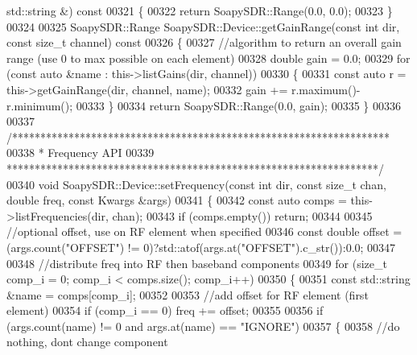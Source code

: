 \begin{DoxyCode}
      std::string &)\textcolor{keyword}{ const}
00321 \textcolor{keyword}{}\{
00322     \textcolor{keywordflow}{return} SoapySDR::Range(0.0, 0.0);
00323 \}
00324 
00325 SoapySDR::Range SoapySDR::Device::getGainRange(\textcolor{keyword}{const} \textcolor{keywordtype}{int} dir, \textcolor{keyword}{const} \textcolor{keywordtype}{size\_t} channel)\textcolor{keyword}{ const}
00326 \textcolor{keyword}{}\{
00327     \textcolor{comment}{//algorithm to return an overall gain range (use 0 to max possible on each element)}
00328     \textcolor{keywordtype}{double} gain = 0.0;
00329     \textcolor{keywordflow}{for} (\textcolor{keyword}{const} \textcolor{keyword}{auto} &name : this->listGains(dir, channel))
00330     \{
00331         \textcolor{keyword}{const} \textcolor{keyword}{auto} r = this->getGainRange(dir, channel, name);
00332         gain += r.maximum()-r.minimum();
00333     \}
00334     \textcolor{keywordflow}{return} SoapySDR::Range(0.0, gain);
00335 \}
00336 
00337 \textcolor{comment}{/*******************************************************************}
00338 \textcolor{comment}{ * Frequency API}
00339 \textcolor{comment}{ ******************************************************************/}
00340 \textcolor{keywordtype}{void} SoapySDR::Device::setFrequency(\textcolor{keyword}{const} \textcolor{keywordtype}{int} dir, \textcolor{keyword}{const} \textcolor{keywordtype}{size\_t} chan, \textcolor{keywordtype}{double} 
      freq, \textcolor{keyword}{const} Kwargs &args)
00341 \{
00342     \textcolor{keyword}{const} \textcolor{keyword}{auto} comps = this->listFrequencies(dir, chan);
00343     \textcolor{keywordflow}{if} (comps.empty()) \textcolor{keywordflow}{return};
00344 
00345     \textcolor{comment}{//optional offset, use on RF element when specified}
00346     \textcolor{keyword}{const} \textcolor{keywordtype}{double} offset = (args.count(\textcolor{stringliteral}{"OFFSET"}) != 0)?std::atof(args.at(\textcolor{stringliteral}{"OFFSET"}).c\_str()):0.0;
00347 
00348     \textcolor{comment}{//distribute freq into RF then baseband components}
00349     \textcolor{keywordflow}{for} (\textcolor{keywordtype}{size\_t} comp\_i = 0; comp\_i < comps.size(); comp\_i++)
00350     \{
00351         \textcolor{keyword}{const} std::string &name = comps[comp\_i];
00352 
00353         \textcolor{comment}{//add offset for RF element (first element)}
00354         \textcolor{keywordflow}{if} (comp\_i == 0) freq += offset;
00355 
00356         \textcolor{keywordflow}{if} (args.count(name) != 0 and args.at(name) == \textcolor{stringliteral}{"IGNORE"})
00357         \{
00358             \textcolor{comment}{//do nothing, dont change component}

\end{DoxyCode}
